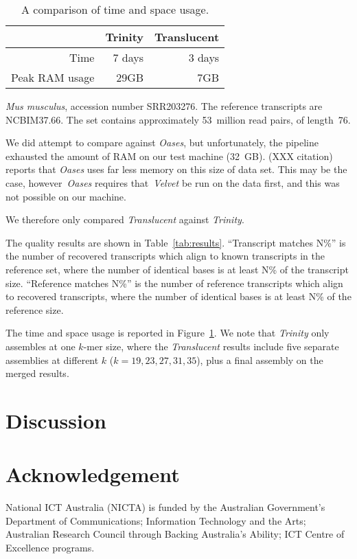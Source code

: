 \documentclass{bioinfo}
\def\Translucent{\textit{Translucent}}
\def\Trinity{\textit{Trinity}}
\def\Oases{\textit{Oases}}
\def\Velvet{\textit{Velvet}}
\def\kmer{$k$-mer}
\begin{document}
\begin{table}
\label{tab:efficiency}
\begin{tabular}{|r|r|r|}
\hline
 & Trinity & Translucent \\
\hline
Time & 7 days & 3 days \\
Peak RAM usage & 29GB & 7GB \\
\hline
\end{tabular}
\caption{A comparison of time and space usage.}
\end{table}

\textit{Mus musculus}, accession number SRR203276. The reference
transcripts are NCBIM37.66.
The set contains approximately 53~million read pairs,
of length~76.

We did attempt to compare against \Oases{}, but unfortunately, the
pipeline exhausted the amount of RAM on our test machine (32~GB).
(XXX citation) reports that \Oases{} uses far less memory on this
size of data set.
This may be the case, however~\Oases{} requires that~\Velvet{} be run
on the data first, and this was not possible on our machine.

We therefore only compared \Translucent{} against \Trinity{}.

The quality results are shown in Table~\ref{tab:results}.
``Transcript matches \@ N\%'' is the number of recovered transcripts
which align to known transcripts in the reference set, where the
number of identical bases is at least N\% of the transcript size.
``Reference matches \@ N\%''
is the number of reference transcripts which align to recovered transcripts,
where the number of identical bases is at least N\% of the reference size.

The time and space usage is reported in Figure~\ref{tab:efficiency}.
We note that \Trinity{} only assembles at one \kmer{} size, where
the \Translucent{} results include five separate assemblies at
different $k$ ($k=19,23,27,31,35$), plus a final assembly on the
merged results.

\section{Discussion}

\section*{Acknowledgement}

National ICT Australia (NICTA) is funded by the Australian Government's Department of Communications; 
Information Technology and the Arts;  
Australian Research Council through Backing Australia's Ability; 
ICT Centre of Excellence programs.



\end{document}
